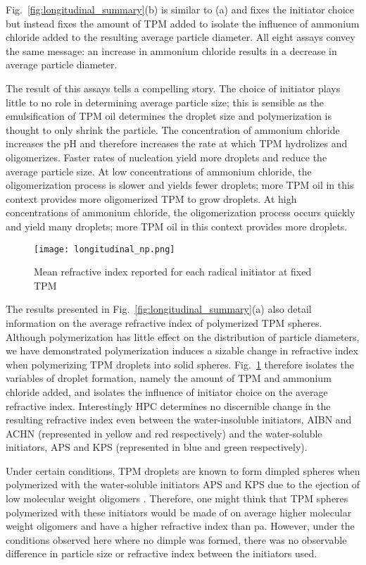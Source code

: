 Fig.~\ref{fig:longitudinal_summary}(b) is similar to (a) and  fixes the initiator choice
but instead fixes the amount of TPM added to isolate the influence of ammonium chloride added
to the resulting average particle diameter. All eight assays convey the same message:
an increase in ammonium chloride results in a decrease in average particle diameter.

The result of this assays tells a compelling story. The choice of initiator plays little
to no role in determining average particle size; this is sensible as the emulsification
of TPM oil determines the droplet size and polymerization is thought to only
shrink the particle. The concentration of ammonium chloride increases the pH and
therefore increases the rate at which TPM hydrolizes and oligomerizes. Faster
rates of nucleation yield more droplets and reduce the average particle size.
At low concentrations of ammonium chloride, the oligomerization process is slower
and yields fewer droplets; more TPM oil in this context provides more oligomerized
TPM to grow droplets. At high concentrations of ammonium chloride, the oligomerization
process occurs quickly and yield many droplets; more TPM oil in this context provides more droplets.


\begin{figure}
    \centering
    \texttt{[image: longitudinal\_np.png]}
    \caption{Mean refractive index reported for each radical initiator
    at fixed TPM}
    \label{fig:longitudinal_np}
\end{figure}

The results presented in Fig.~\ref{fig:longitudinal_summary}(a) also detail information
on the average refractive index of polymerized TPM spheres. Although polymerization
has little effect on the distribution of particle diameters, we have demonstrated
polymerization induces a sizable change in refractive index when polymerizing TPM
droplets into solid spheres. Fig.~\ref{fig:longitudinal_np} therefore isolates the
variables of droplet formation, namely the amount of TPM and ammonium chloride added,
and isolates the influence of initiator choice on the average refractive index.
Interestingly HPC determines no discernible change in the resulting refractive index
even between the water-insoluble initiators, AIBN and ACHN
(represented in yellow and red respectively) and the water-soluble initiators, APS and KPS (represented in blue and green respectively).

Under certain conditions, TPM droplets are known to form dimpled spheres when polymerized
with the water-soluble initiators APS and KPS due to the ejection of low molecular weight
oligomers \cite{sacanna11}.
Therefore, one might think that TPM spheres polymerized with these initiators would be
made of on average higher molecular weight oligomers and have a higher refractive index
than pa. However, under the conditions observed here where no dimple was formed, there
was no observable difference in particle size or refractive index between the initiators
used.

